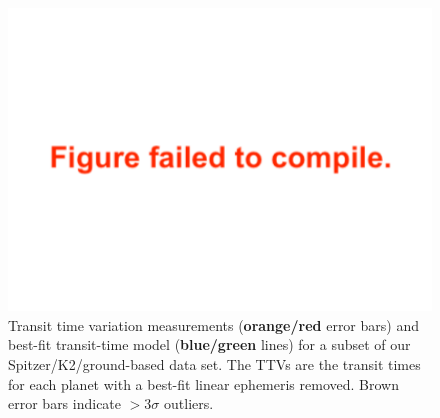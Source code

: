 \documentclass[twocolumn]{aastex63}
\begin{document}
\begin{figure}
    \includegraphics[width=0.95\hsize]{figures/T1_ttvs_4panel_stacked.pdf}
    {Transit time variation measurements (\textbf{orange/red} error bars) and best-fit
        transit-time model (\textbf{blue/green} lines) for a subset of our
        Spitzer/K2/ground-based data set.  The TTVs are the transit times for each planet
        with a best-fit linear ephemeris removed.  Brown error bars indicate $>3\sigma$ outliers.  %
}
    \label{fig:T1_TTVs}
\end{figure}
\end{document}
